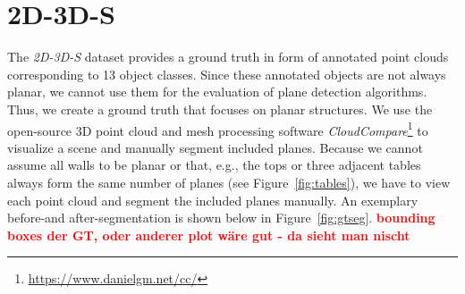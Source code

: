 \documentclass[main.tex]{subfiles}
\begin{document}
\section{2D-3D-S}
\label{sec:gtseg}
The \textit{2D-3D-S} dataset provides a ground truth in form of annotated point clouds corresponding to 13 object classes. Since these annotated objects are not
always planar, we cannot use them for the evaluation of plane detection algorithms. Thus, we create a ground truth that focuses on planar structures.
We use the open-source 3D point cloud and mesh processing software \textit{CloudCompare}\footnote{\href{https://www.danielgm.net/cc/}{https://www.danielgm.net/cc/}} to visualize a scene and manually segment included planes.
Because we cannot assume all walls to be planar or that, e.g., the tops or three adjacent tables always form the same number of planes (see Figure~\ref{fig:tables}), we
have to view each point cloud and segment the included planes manually. An exemplary before-and after-segmentation is shown below in Figure~\ref{fig:gtseg}.
\textbf{\textcolor{red}{bounding boxes der GT, oder anderer plot wäre gut - da sieht man nischt}}
\end{document}

